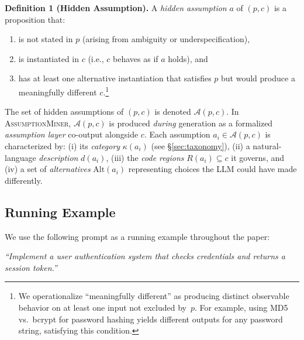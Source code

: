 \documentclass[sigconf,review,anonymous]{acmart}
\newcommand{\sysname}{\textsc{AssumptionMiner}\xspace}
\begin{document}
\begin{mdframed}[linewidth=0.8pt, innerleftmargin=6pt, innerrightmargin=6pt,
                 innertopmargin=4pt, innerbottommargin=4pt]
\textbf{Definition 1 (Hidden Assumption).}
A \emph{hidden assumption} $a$ of $(p, c)$ is a proposition that:
\begin{enumerate}[label=(\roman*), noitemsep, topsep=2pt]
  \item is not stated in $p$ (arising from ambiguity or underspecification),
  \item is instantiated in $c$ (i.e., $c$ behaves as if $a$ holds), and
  \item has at least one alternative instantiation that satisfies $p$ but would
        produce a meaningfully different $c$.\footnote{We operationalize
        ``meaningfully different'' as producing distinct observable behavior on
        at least one input not excluded by~$p$. For example, using MD5 vs.\
        bcrypt for password hashing yields different outputs for any password
        string, satisfying this condition.}
\end{enumerate}
\end{mdframed}

\noindent The set of hidden assumptions of $(p, c)$ is denoted $\mathcal{A}(p,c)$.
In \sysname, $\mathcal{A}(p,c)$ is produced \emph{during} generation as a formalized
\emph{assumption layer} co-output alongside $c$.
Each assumption $a_i \in \mathcal{A}(p,c)$ is characterized by:
(i) its \emph{category} $\kappa(a_i)$ (see \S\ref{sec:taxonomy}),
(ii) a natural-language \emph{description} $d(a_i)$,
(iii) the \emph{code regions} $R(a_i) \subseteq c$ it governs, and
(iv) a set of \emph{alternatives} $\text{Alt}(a_i)$ representing choices the LLM
     could have made differently.

\subsection{Running Example}
\label{sec:example}

We use the following prompt as a running example throughout the paper:

\begin{mdframed}[linewidth=0.8pt, backgroundcolor=gray!7,
                 innerleftmargin=8pt, innerrightmargin=8pt,
                 innertopmargin=4pt, innerbottommargin=4pt]
\emph{``Implement a user authentication system that checks credentials
and returns a session token.''}
\end{mdframed}
\end{document}
